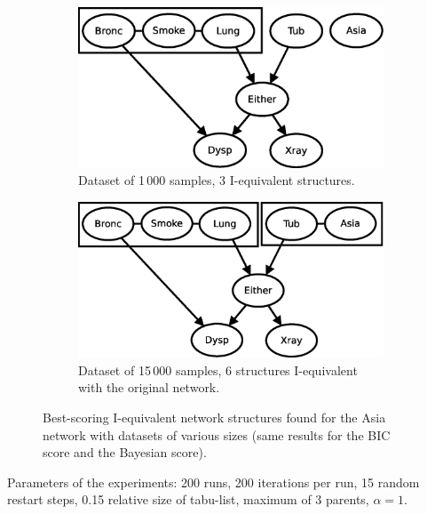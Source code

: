 \documentclass[english,cover]{fitthesis} %
\begin{document}
\begin{figure}[ht]
    \centering
    \begin{subfigure}[b]{0.45\linewidth}
        \includegraphics[scale=0.39]{fig/structure-learning-asia-1000}
        \caption{Dataset of 1\,000 samples, 3 I-equivalent structures.}
        \label{fig:structure-learning-asia-1000}
    \end{subfigure}
    \qquad
    \begin{subfigure}[b]{0.45\linewidth}
        \centering
        \includegraphics[scale=0.39]{fig/structure-learning-asia-15000}
        \caption{Dataset of 15\,000 samples, 6 structures I-equivalent with the original network.}
        \label{fig:structure-learning-asia-15000}
    \end{subfigure}
    \caption{Best-scoring I-equivalent network structures found for the Asia network with datasets of various sizes (same results for the BIC score and the Bayesian score).}
    \label{fig:structure-learning-asia}
\end{figure}

Parameters of the experiments: 200 runs, 200 iterations per run, 15 random restart steps, 0.15 relative size of tabu-list, maximum of 3 parents, $\alpha=1$.
\end{document}
